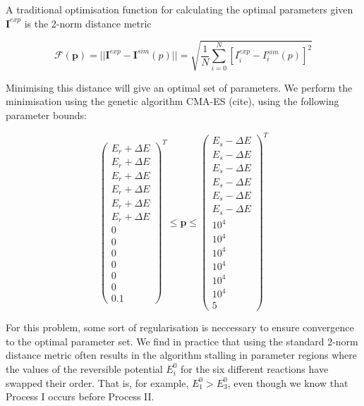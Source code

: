\documentclass[a4paper, 12pt]{article}
\begin{document}
A traditional optimisation function for calculating the optimal parameters given $\mathbf{I}^{exp}$ is the 2-norm distance metric

\begin{equation}
    \mathcal{F}(\mathbf{p}) = ||\mathbf{I}^{exp}-\mathbf{I}^{sim}(p)|| = \sqrt{\frac{1}{N}\sum_{i=0}^{N} [I^{exp}_i-I^{sim}_i(p)]^2}
\end{equation}

Minimising this distance will give an optimal set of parameters. We perform the
minimisation using the genetic algorithm CMA-ES (\TODO cite), using the
following parameter bounds:

\begin{equation}\label{eq:bounds}
    \begin{pmatrix}
        E_{r}+\Delta E \\
        E_{r}+\Delta E \\
        E_{r}+\Delta E \\
        E_{r}+\Delta E \\
        E_{r}+\Delta E \\
        E_{r}+\Delta E \\
        0 \\
        0 \\
        0 \\
        0 \\
        0 \\
        0 \\
        0.1
    \end{pmatrix}^T
    \le \mathbf{p} \le
    \begin{pmatrix}
        E_{s}-\Delta E \\
        E_{s}-\Delta E \\
        E_{s}-\Delta E \\
        E_{s}-\Delta E \\
        E_{s}-\Delta E \\
        E_{s}-\Delta E \\
        10^4 \\
        10^4 \\
        10^4 \\
        10^4 \\
        10^4 \\
        10^4 \\
        5
    \end{pmatrix}^T
\end{equation}

For this problem, some sort of regularisation is neccessary to ensure
convergence to the optimal parameter set. We find in practice that using the
standard 2-norm distance metric often results in the algorithm stalling in
parameter regions where the values of the reversible potential $E^0_i$ for the six
different reactions have swapped their order. That is, for example, $E^0_1 >
E^0_3$, even though we know that Process I occurs before Process II. 
\end{document}

